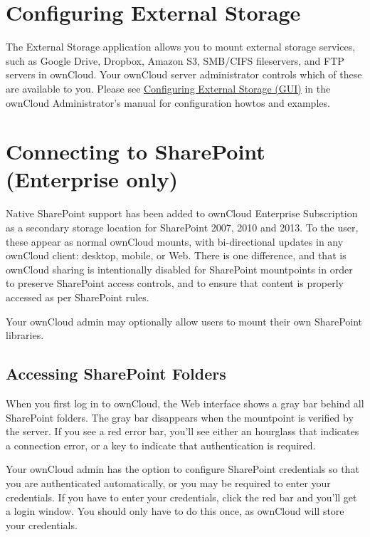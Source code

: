 \documentclass[letterpaper,10pt,english]{sphinxmanual}
\begin{document}
\section{Configuring External Storage}
\label{external_storage/external_storage::doc}\label{external_storage/external_storage:configuring-external-storage}
The External Storage application allows you to mount external storage services,
such as Google Drive, Dropbox, Amazon S3, SMB/CIFS fileservers, and FTP servers
in ownCloud. Your ownCloud server administrator controls which of these are
available to you. Please see \href{https://doc.owncloud.org/server/9.0/admin\_manual/configuration\_files/external\_storage\_configuration\_gui.html}{Configuring External Storage (GUI)} in the ownCloud Administrator's
manual for configuration howtos and examples.


\section{Connecting to SharePoint (Enterprise only)}
\label{external_storage/sharepoint_connecting:connecting-to-sharepoint-enterprise-only}\label{external_storage/sharepoint_connecting::doc}
Native SharePoint support has been added to ownCloud Enterprise Subscription as
a secondary storage location for SharePoint 2007, 2010 and 2013. To the user,
these appear as normal ownCloud mounts, with bi-directional updates in any
ownCloud client: desktop, mobile, or Web. There is one difference, and that is
ownCloud sharing is intentionally disabled for SharePoint mountpoints in order
to preserve SharePoint access controls, and to ensure that content is properly
accessed as per SharePoint rules.

Your ownCloud admin may optionally allow users to mount their own SharePoint
libraries.


\subsection{Accessing SharePoint Folders}
\label{external_storage/sharepoint_connecting:accessing-sharepoint-folders}
When you first log in to ownCloud, the Web interface shows a gray bar behind all
SharePoint folders. The gray bar disappears when the mountpoint is verified by
the server. If you see a red error bar, you'll see either an hourglass that
indicates a connection error, or a key to indicate that authentication is
required.

Your ownCloud admin has the option to configure SharePoint credentials so that
you are authenticated automatically, or you may be required to enter your
credentials. If you have to enter your credentials, click the red bar and you'll
get a login window. You should only have to do this once, as ownCloud will store
your credentials.
\end{document}
